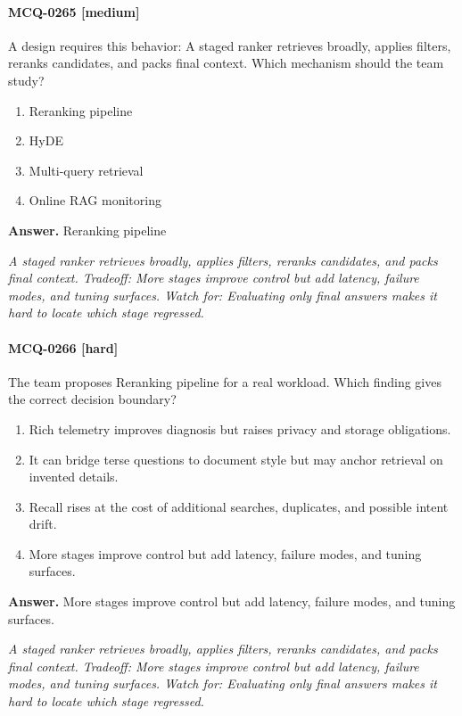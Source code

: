 \paragraph{MCQ-0265 [medium]} A design requires this behavior: A staged ranker retrieves broadly, applies filters, reranks candidates, and packs final context. Which mechanism should the team study?
\begin{enumerate}[label=\Alph*.]
\item Reranking pipeline
\item HyDE
\item Multi-query retrieval
\item Online RAG monitoring
\end{enumerate}
\noindent\textbf{Answer.} Reranking pipeline
\par\textit{A staged ranker retrieves broadly, applies filters, reranks candidates, and packs final context. Tradeoff: More stages improve control but add latency, failure modes, and tuning surfaces. Watch for: Evaluating only final answers makes it hard to locate which stage regressed.}
\paragraph{MCQ-0266 [hard]} The team proposes Reranking pipeline for a real workload. Which finding gives the correct decision boundary?
\begin{enumerate}[label=\Alph*.]
\item Rich telemetry improves diagnosis but raises privacy and storage obligations.
\item It can bridge terse questions to document style but may anchor retrieval on invented details.
\item Recall rises at the cost of additional searches, duplicates, and possible intent drift.
\item More stages improve control but add latency, failure modes, and tuning surfaces.
\end{enumerate}
\noindent\textbf{Answer.} More stages improve control but add latency, failure modes, and tuning surfaces.
\par\textit{A staged ranker retrieves broadly, applies filters, reranks candidates, and packs final context. Tradeoff: More stages improve control but add latency, failure modes, and tuning surfaces. Watch for: Evaluating only final answers makes it hard to locate which stage regressed.}
